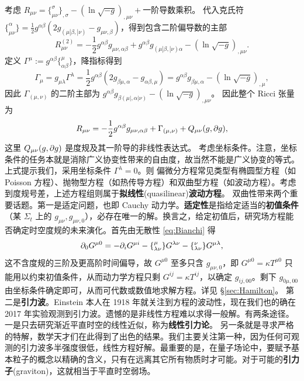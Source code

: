 考虑 $R_{\mu\nu} = \{^\sigma_{\mu\nu}\}_{,\sigma}-(\ln\sqrt{-g})_{,\mu\nu}+\text{一阶导数乘积}$。
代入克氏符 $\{^\alpha_{\mu\nu}\} = \frac{1}{2}g^{\alpha\beta}(2g_{(\mu|\beta,|\nu)} - g_{\mu\nu,\beta})$，得到包含二阶偏导数的主部
\[
R_{\mu\nu}^{(2)} = -\frac{1}{2} g^{\alpha\beta} g_{\mu\nu,\alpha\beta} + g^{\alpha\beta} g_{(\mu|\beta,|\nu)\alpha} - (\ln \sqrt{-g})_{,\mu\nu}.
\]
定义 $\Gamma^\mu := g^{\alpha\beta}\{^\mu_{\alpha\beta}\}$，降指标得到
\[\Gamma_\mu = g_{\mu\lambda}\Gamma^\lambda = \frac{1}{2} g^{\alpha\beta} (2 g_{\beta\mu,\alpha} -  g_{\alpha\beta,\mu}) = g^{\alpha\beta} g_{\beta\mu,\alpha} - (\ln \sqrt{-g})_{,\mu},\]
因此 $\Gamma_{(\mu,\nu)}$ 的二阶主部为 $g^{\alpha\beta} g_{\beta(\mu|,\alpha|\nu)} - (\ln \sqrt{-g})_{,\mu\nu}$。
因此整个 Ricci 张量为
\[R_{\mu\nu} = -\frac{1}{2} g^{\alpha\beta} g_{\mu\nu,\alpha\beta} + \Gamma_{(\mu,\nu)} + Q_{\mu\nu}(g, \partial g),\]
这里 $Q_{\mu\nu}(g, \partial g)$ 是度规及其一阶导的非线性表达式。
考虑坐标条件。注意，坐标条件的任务本就是消除广义协变性带来的自由度，故当然不能是广义协变的等式。
上式提示我们，采用坐标条件 $\Gamma^\lambda = 0$。则
偏微分方程常见类型有椭圆型方程（如 Poisson 方程）、抛物型方程（如热传导方程）和双曲型方程（如波动方程）。考虑到度规号差，上述方程组则属于\textbf{拟线性}(quasilinear)\textbf{波动方程}。
双曲性带来两个重要话题。第一是适定问题，也即 Cauchy 动力学。\textbf{适定性}是指给定适当的\textbf{初值条件}（某 $\Sigma_t$ 上的 $g_{\mu\nu},g_{\mu\nu,0}$），必存在唯一的解。换言之，给定初值后，研究场方程能否确定时空度规的未来演化。首先由无散性 \eqref{eq:Bianchi} 得
\[\partial_0 G^{\mu 0} =-\partial_i G^{\mu i} - \{^\mu_{\lambda\nu}\} G^{\lambda\nu} - \{^\nu_{\lambda\nu}\} G^{\mu\lambda},\]
这不含度规的三阶及更高阶时间偏导，故 $G^{\mu 0}$ 至多只含 $g_{\mu\nu,0}$，即 $G^{\mu 0} =\kappa T^{\mu 0}$ 只能用以约束初值条件，从而动力学方程只剩 $G^{ij} =\kappa T^{ij}$，以确定 $g_{ij,00}$。剩下 $g_{0\mu,00}$ 由坐标条件确定即可，从而可代数或数值地求解方程。详见 \S\ref{sec:Hamilton}。
第二是\textbf{引力波}。Einstein 本人在 1918 年就关注到方程的波动性，现在我们也的确在 2017 年实验观测到引力波。遗憾的是非线性方程难以求得一般解。有两条途径。
一是只去研究渐近平直时空的线性近似，称为\textbf{线性引力论}。
另一条就是寻求严格的特解，数学天才们在此得到了出色的结果。我们主要关注第一种，因为任何可观测的引力波多半强度很低，线性方程好解。最重要的是，在量子场论中，要赋予基本粒子的概念以精确的含义，只有在远离其它所有物质时才可能。对于可能的\textbf{引力子}(graviton)，这就相当于平直时空弱场。

